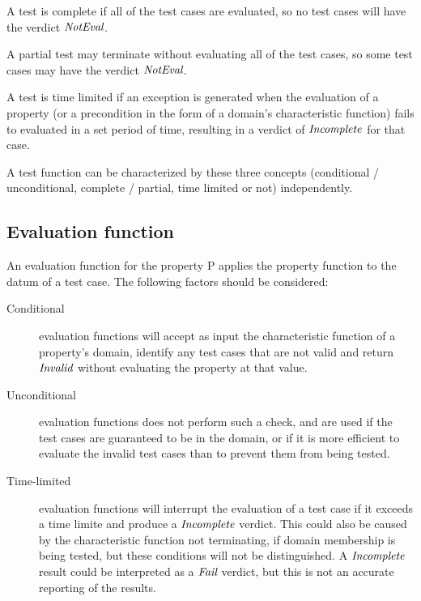 \begin{df}
A test is complete if all of the test cases are evaluated,
so no test cases will have the verdict $\emph{NotEval}$.
\end{df}
\begin{df}
A partial test may terminate without evaluating all of the test cases,
so some test cases may have the verdict $\emph{NotEval}$.
\end{df}

\begin{df}
A test is time limited if an exception is generated when
the evaluation of a property (or a precondition in the form of a domain's characteristic function)
fails to evaluated in a set period of time,
resulting in a verdict of $\emph{Incomplete}$ for that case.
\end{df}

A test function can be characterized by these three concepts
(conditional / unconditional, complete / partial, time limited or not) independently.

\subsection{Evaluation function}

An evaluation function for the property P
applies the property function to the datum of a test case.
The following factors should be considered:

\begin{description}
\item[Conditional] evaluation functions will accept as input the characteristic function of a property's domain,
identify any test cases that are not valid and return $\emph{Invalid}$ without evaluating the property at that value.
\item[Unconditional] evaluation functions does not perform such a check,
and are used if the test cases are guaranteed to be in the domain,
or if it is more efficient to evaluate the invalid test cases
than to prevent them from being tested.
\item[Time-limited] evaluation functions will interrupt the evaluation of a test case
if it exceeds a time limite and produce a $\emph{Incomplete}$ verdict.
This could also be caused by the characteristic function not terminating,
if domain membership is being tested,
but these conditions will not be distinguished.
A $\emph{Incomplete}$ result could be interpreted as a $\emph{Fail}$ verdict,
but this is not an accurate reporting of the results.
\end{description}

